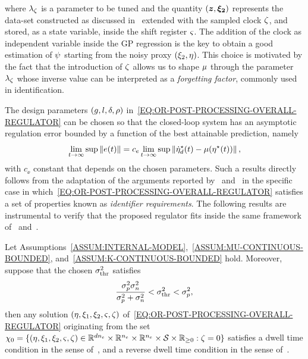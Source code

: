 where $\lambda_{\zeta}$ is a parameter to be tuned and the quantity $\left( \boldsymbol{z}, \boldsymbol{\xi_2} \right)$ represents the data-set
constructed as discussed in~ extended with the sampled clock $\zeta$,
and stored, as a state variable, inside the shift register $\varsigma$.
The addition of the clock as independent variable inside the GP regression is the key to obtain a good estimation of $\psi$ starting from
the noisy proxy $\left( \xi_2, \eta \right)$. This choice is motivated by the fact that the introduction of $\zeta$ allows us to shape $\mu$
through the parameter $\lambda_{\zeta}$ whose inverse value can be interpreted as a \textit{forgetting factor}, commonly used in identification.

The design parameters $\left( g, l, \delta, \rho \right)$ in~\eqref{EQ:OR-POST-PROCESSING-OVERALL-REGULATOR} can be chosen so that the closed-loop
system has an asymptotic regulation error bounded by a function of the best attainable prediction, namely
\begin{equation*}
   \lim_{t \to \infty} \sup \left \lVert {e(t)} \right \rVert = c_{e} \lim_{t \to \infty} \sup \left \lVert {\dot{\eta}_d^{\star}(t) - \mu(\eta^{\star}(t))} \right \rVert,
\end{equation*}
with $c_{\ee}$ constant that depends on the chosen parameters.
Such a results directly follows from the adaptation of the arguments reported by~\cite{bin2019class} and~\cite{bin2020approximate}
in the specific case in which~\eqref{EQ:OR-POST-PROCESSING-OVERALL-REGULATOR} satisfies a set of properties known as \textit{identifier requirements}.
The following results are instrumental to verify that the proposed regulator fits inside the same framework of~\cite{bin2019class} and~\cite{bin2020approximate}.
\begin{lemma}%
   \label{LEMMA:DWELL-TIME}
   Let Assumptions~\ref{ASSUM:INTERNAL-MODEL},~\ref{ASSUM:MU-CONTINUOUS-BOUNDED}, and~\ref{ASSUM:K-CONTINUOUS-BOUNDED} hold.
   Moreover, suppose that the chosen $\sigma^2_{\text{thr}}$ satisfies
   \begin{equation}%
      \label{EQ:OR-POSTP-SIGMA-CONDITION}
      \frac{\np \nn}{\np + \nn} < \pvar_{\text{thr}} < \np,
   \end{equation}
   then any solution $\left( \eta, \xi_1, \xi_2, \varsigma, \zeta \right)$ of~\eqref{EQ:OR-POST-PROCESSING-OVERALL-REGULATOR} originating from the set
   $\chi_0 = \{ \left( \eta, \xi_1, \xi_2, \varsigma, \zeta \right) \in \mathbb{R}^{dn_{e}} \times \mathbb{R}^{n_{e}} \times \mathbb{R}^{n_{e}} \times \mathcal{S} \times \mathbb{R}_{\ge 0} : \zeta = 0\}$
   satisfies a dwell time condition in the sense of~\cite{hespanha1999stability}, and a reverse dwell time condition in
   the sense of~\cite{hespanha2005input}.
\end{lemma}
